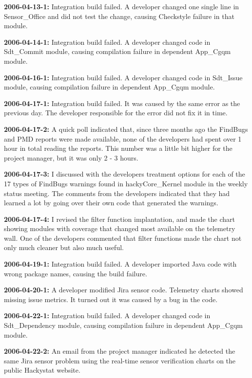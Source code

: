 \textbf{2006-04-13-1:}
Integration build failed. A developer changed one single line in Sensor\_Office and did not test the change, causing Checkstyle failure in that module.

\textbf{2006-04-14-1:}
Integration build failed. A developer changed code in Sdt\_Commit module, causing compilation failure in dependent App\_Cgqm module. 

\textbf{2006-04-16-1:}
Integration build failed. A developer changed code in Sdt\_Issue module, causing compilation failure in dependent App\_Cgqm module. 

\textbf{2006-04-17-1:}
Integration build failed. It was caused by the same error as the previous day. The developer responsible for the error did not fix it in time.


\textbf{2006-04-17-2:}
A quick poll indicated that, since three months ago the FindBugs and PMD reports were made available, none of the developers had spent over 1 hour in total reading the reports. This number was a little bit higher for the project manager, but it was only 2 - 3 hours.  

\textbf{2006-04-17-3:}
I discussed with the developers treatment options for each of the 17 types of FindBugs warnings found in hackyCore\_Kernel module in the weekly status meeting. The comments from the developers indicated that they had learned a lot by going over their own code that generated the warnings.

\textbf{2006-04-17-4:}
I revised the filter function implantation, and made the chart showing modules with coverage that changed most available on the telemetry wall. One of the developers commented that filter functions made the chart not only much cleaner but also much useful. 

\textbf{2006-04-19-1:}
Integration build failed. A developer imported Java code with wrong package names, causing the build failure.

\textbf{2006-04-20-1:}
A developer modified Jira sensor code. Telemetry charts showed missing issue metrics. It turned out it was caused by a bug in the code.

\textbf{2006-04-22-1:}
Integration build failed. A developer changed code in Sdt\_Dependency module, causing compilation failure in dependent App\_Cgqm module. 

\textbf{2006-04-22-2:}
An email from the project manager indicated he detected the same Jira sensor problem using the real-time sensor verification charts on the public Hackystat website.    

